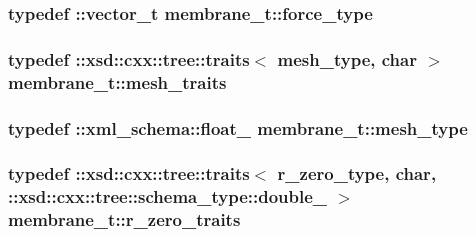 \subsubsection[{\texorpdfstring{force\+\_\+type}{force_type}}]{\setlength{\rightskip}{0pt plus 5cm}typedef \+::{\bf vector\+\_\+t} {\bf membrane\+\_\+t\+::force\+\_\+type}}\hypertarget{classmembrane__t_ab4d91a3ba331c16adbf69418f876f849}{}\label{classmembrane__t_ab4d91a3ba331c16adbf69418f876f849}
\subsubsection[{\texorpdfstring{mesh\+\_\+traits}{mesh_traits}}]{\setlength{\rightskip}{0pt plus 5cm}typedef \+::xsd\+::cxx\+::tree\+::traits$<$ {\bf mesh\+\_\+type}, char $>$ {\bf membrane\+\_\+t\+::mesh\+\_\+traits}}\hypertarget{classmembrane__t_a6b611201cacd05e394dc2d6750a33ff9}{}\label{classmembrane__t_a6b611201cacd05e394dc2d6750a33ff9}
\subsubsection[{\texorpdfstring{mesh\+\_\+type}{mesh_type}}]{\setlength{\rightskip}{0pt plus 5cm}typedef \+::{\bf xml\+\_\+schema\+::float\+\_\+} {\bf membrane\+\_\+t\+::mesh\+\_\+type}}\hypertarget{classmembrane__t_a259dfb54e3d4a66cdd72b5b0831f4188}{}\label{classmembrane__t_a259dfb54e3d4a66cdd72b5b0831f4188}
\subsubsection[{\texorpdfstring{r\+\_\+zero\+\_\+traits}{r_zero_traits}}]{\setlength{\rightskip}{0pt plus 5cm}typedef \+::xsd\+::cxx\+::tree\+::traits$<$ {\bf r\+\_\+zero\+\_\+type}, char, \+::xsd\+::cxx\+::tree\+::schema\+\_\+type\+::double\+\_\+ $>$ {\bf membrane\+\_\+t\+::r\+\_\+zero\+\_\+traits}}\hypertarget{classmembrane__t_aebe5eb10f95c19f95c3946d3bbb9adb8}{}\label{classmembrane__t_aebe5eb10f95c19f95c3946d3bbb9adb8}
